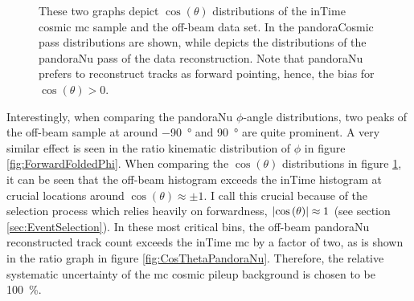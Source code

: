 \begin{figure}[htbp]
    \centering
    \caption[Cosmic-Ray Reconstruction $\cos{(\theta)}$ Distributions]{These two graphs depict $\cos{(\theta)}$ distributions of the inTime cosmic \gls{mc} sample and the off-beam data set. In  the pandoraCosmic pass distributions are shown, while  depicts the distributions of the pandoraNu pass of the data reconstruction. Note that pandoraNu prefers to reconstruct tracks as forward pointing, hence, the bias for $\cos{(\theta)} > 0$.}
    \label{fig:CosmicRecoCosTheta}
\end{figure}
Interestingly, when comparing the pandoraNu $\phi$-angle distributions, two peaks of the off-beam sample at around \SI{-90}{\degree} and \SI{90}{\degree} are quite prominent. A very similar effect is seen in the ratio kinematic distribution of $\phi$ in figure \ref{fig:ForwardFoldedPhi}. When comparing the $\cos{(\theta)}$ distributions in figure \ref{fig:CosmicRecoCosTheta}, it can be seen that the off-beam histogram exceeds the inTime histogram at crucial locations around $\cos{(\theta)} \approx \pm 1$. I call this crucial because of the selection process which relies heavily on forwardness, \ie $\abs{\cos{(\theta)}} \approx 1$ (see section \ref{sec:EventSelection}). In these most critical bins, the off-beam pandoraNu reconstructed track count exceeds the inTime \gls{mc} by a factor of two, as is shown in the ratio graph in figure \ref{fig:CosThetaPandoraNu}. Therefore, the relative systematic uncertainty of the \gls{mc} cosmic pileup background is chosen to be \SI{100}{\percent}.

